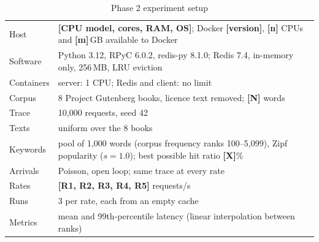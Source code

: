\begin{table}[t]
\caption{Phase 2 experiment setup}
\label{tab:setup}
\centering
\footnotesize
\begin{tabular}{@{}p{}p{}@{}}
\hline
Host & \textbf{[CPU model, cores, RAM, OS]}; Docker \textbf{[version]}, \textbf{[n]} CPUs and \textbf{[m]}\,GB available to Docker \\
Software & Python 3.12, RPyC 6.0.2, redis-py 8.1.0; Redis 7.4, in-memory only, 256\,MB, LRU eviction \\
Containers & server: 1 CPU; Redis and client: no limit \\
Corpus & 8 Project Gutenberg books, licence text removed; \textbf{[N]} words \\
Trace & 10{,}000 requests, seed 42 \\
Texts & uniform over the 8 books \\
Keywords & pool of 1{,}000 words (corpus frequency ranks 100--5{,}099), Zipf popularity ($s=1.0$); best possible hit ratio \textbf{[X]}\% \\
Arrivals & Poisson, open loop; same trace at every rate \\
Rates & \textbf{[R1, R2, R3, R4, R5]} requests/s \\
Runs & 3 per rate, each from an empty cache \\
Metrics & mean and 99th-percentile latency (linear interpolation between ranks) \\
\hline
\end{tabular}
\end{table}

